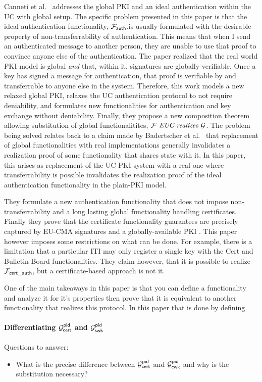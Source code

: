 Canneti et al.~\cite{uc-pki} addresses the global PKI and an ideal authentication within the UC with global setup.
The specific problem presented in this paper is that the ideal authentication functionality, $\mathcal{F}_{{\mathsf {auth}}}$,is usually formulated with the desirable property of non-transferrability of authentication.
This means that when I send an authenticated message to another person, they are unable to use that proof to convince anyone else of the authentication.
The paper realized that the real world PKI model is global \emph{and} that, within it, signatures are globally verifiable.
Once a key has signed a message for authentication, that proof is verifiable by and transferrable to anyone else in the system.
Therefore, this work models a new relaxed global PKI, relaxes the UC authentication protocol to not require deniability, and formulates new functionalities for authentication and key exchange without deniability.
Finally, they propose a new composition theorem allowing substitution of global functionalitites, $\mathcal{F} \textit{ EUC-realizes } \mathcal{G}$.
The problem being solved relates back to a claim made by Badertscher et al.~\cite{badertscher2017bitcoin} that replacement of global functionalities with real implementations generally invalidates a realization proof of some functionality that shares state with it. 
In this paper, this arises as replacement of the UC PKI system with a real one where transferrability is possible invalidates the realization proof of the ideal authentication functionality in the plain-PKI model.

They formulate a new authentication functionality that does not impose non-transferrability and a long lasting global functionality handling certificates.
Finally they prove that the certificate functionality guarantees are precisely captured by EU-CMA signatures and a globally-available PKI .
This paper however imposes some restrictions on what can be done.
For example, there is a limitation that a particular ITI may only register a single key with the Cert and Bulletin Board functionalities.
They claim however, that it is possible to realize $\mathcal{F}_{{\mathsf {cert\_auth}}}$, but a certificate-based approach is not it.

One of the main takeaways in this paper is that you can define a functionality and analyze it for it's properties then prove that it is equivalent to another functionality that realizes this protocol. 
In this paper that is done by defining

\paragraph{Differentiating $\mathcal{G}_{{\mathsf {cert}}}^{{\mathsf {pid}}}$ and $\mathcal{G}_{{\mathsf {swk}}}^{{\mathsf {pid}}}$}

Questions to answer:
\begin{itemize}
\item What is the precise difference between $\mathcal{G}_{{\mathsf {cert}}}^{{\mathsf {pid}}}$ and $\mathcal{G}_{{\mathsf {cwk}}}^{{\mathsf {pid}}}$ and why is the substitution necessary?
\end{itemize}


